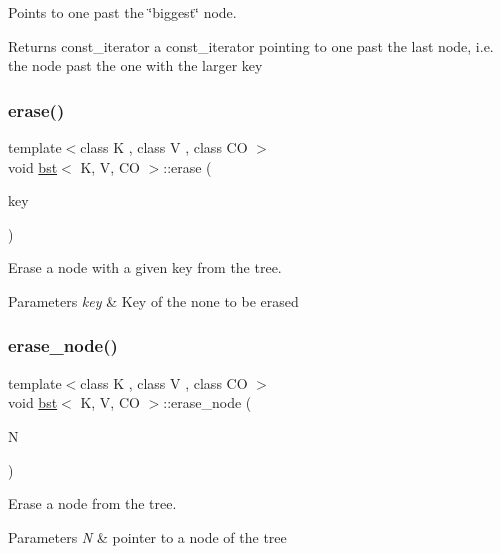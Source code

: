 Points to one past the \char`\"{}biggest\char`\"{} node. 

\begin{DoxyReturn}{Returns}
const\+\_\+iterator a const\+\_\+iterator pointing to one past the last node, i.\+e. the node past the one with the larger key 
\end{DoxyReturn}
\mbox{\label{classbst_a7ba6cc2f31ec7cba0602b395399435bb}} 
\subsubsection{\texorpdfstring{erase()}{erase()}}
{\footnotesize\ttfamily template$<$class K , class V , class CO $>$ \\
void \hyperlink{classbst}{bst}$<$ K, V, CO $>$\+::erase (\begin{DoxyParamCaption}\item[{const key\+\_\+type \&}]{key }\end{DoxyParamCaption})}



Erase a node with a given key from the tree. 


\begin{DoxyParams}{Parameters}
{\em key} & Key of the none to be erased \\
\hline
\end{DoxyParams}
\mbox{\label{classbst_a02680e885b7fda951341d8ee2de2df32}} 
\subsubsection{\texorpdfstring{erase\+\_\+node()}{erase\_node()}}
{\footnotesize\ttfamily template$<$class K , class V , class CO $>$ \\
void \hyperlink{classbst}{bst}$<$ K, V, CO $>$\+::erase\+\_\+node (\begin{DoxyParamCaption}\item[{\hyperlink{classbst}{bst}$<$ K, V, CO $>$\+::\hyperlink{structbst_1_1node}{node} $\ast$}]{N }\end{DoxyParamCaption})}



Erase a node from the tree. 


\begin{DoxyParams}{Parameters}
{\em N} & pointer to a node of the tree \\
\hline
\end{DoxyParams}
\mbox{\label{classbst_aa18c04b701015791c9211261cbc0390e}} 
